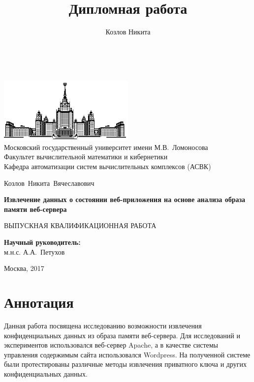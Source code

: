 \documentclass[20pt]{article}
\title{Дипломная работа}
\author{Козлов Никита}
\begin{document}
\thispagestyle{empty}

\begin{center}
\ \vspace{-4cm}

\includegraphics[width=0.5\textwidth]{msu}\\
{Московский государственный университет имени М.В.~Ломоносова}\\
Факультет вычислительной математики и кибернетики\\
Кафедра автоматизации систем вычислительных комплексов (АСВК)

\vspace{5cm}

{\Large Козлов~Никита~Вячеславович}

\vspace{1cm}

{\Large\bfseries
Извлечение данных о состоянии веб-приложения на основе анализа образа памяти веб-сервера\\ }

\vspace{1cm}

{\large ВЫПУСКНАЯ КВАЛИФИКАЦИОННАЯ РАБОТА}
\end{center}

\vfill

\begin{flushright}
  \textbf{Научный руководитель:}\\
  м.н.с. А.А.~Петухов
\end{flushright}

\vfill

\begin{center}
Москва, 2017
\end{center}

\enlargethispage{4\baselineskip}

\newpage

\section*{Аннотация}
Данная работа посвящена исследованию возможности извлечения конфиденциальных
данных из образа памяти веб-сервера. Для исследований и экспериментов
использовался веб-сервер Apache, а в качестве системы управления содержимым
сайта использовался Wordpress. На полученной системе были протестированы
различные методы извлечения приватного ключа и других конфиденциальных данных.
\end{document}
